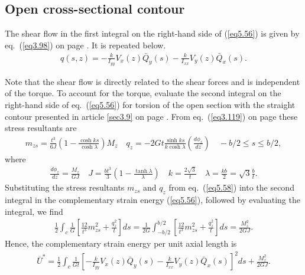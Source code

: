 \documentclass{AeroStructure-ERJohnson}
\begin{document}
\subsection{Open cross-sectional contour}\label{sec5.5.1}

The shear flow in the first integral on the right-hand side of (\ref{eq5.56}) is given by eq.~(\ref{eq3.98}) on page \pageref{eq3.98}. It is repeated below.
\begin{align}\label{eq5.57}
q(s, z)=-\frac{k}{I_{y y}} V_{x}(z) \bar{Q}_{y}(s)-\frac{k}{I_{x x}} V_{y}(z) \bar{Q}_{x}(s).
\end{align}
\vspace*{5pt}
\clearpage

\noindent Note that the shear flow is directly related to the shear forces and is independent of the torque. To account for the torque, evaluate the second integral on the right-hand side of eq.~(\ref{eq5.56}) for torsion of the open section with the straight contour presented in article \ref{sec3.9} on page \pageref{sec3.9}. From eq.~(\ref{eq3.119}) on page \pageref{eq3.119} these stress resultants are
\begin{align}\label{eq5.58}
m_{z s}=\frac{t^{3}}{6 J}\left(1-\frac{\cosh k s}{\cosh \lambda}\right) M_{z} \quad q_{z}=-2 G t \frac{\sinh k s}{k \cosh \lambda}\left(\frac{d \phi_{z}}{d z}\right) \quad-b / 2 \leq s \leq b / 2,
\end{align}
where
\begin{align*}
\frac{d \phi_{z}}{d z}=\frac{M_{z}}{G J} \quad J=\frac{b t^{3}}{3}\left(1-\frac{\tanh \lambda}{\lambda}\right) \quad k=\frac{2 \sqrt{3}}{t} \quad \lambda=\frac{k b}{2}=\sqrt{3} \frac{b}{t}.
\end{align*}
Substituting the stress resultants $m_{z s}$ and $q_z$ from eq.~(\ref{eq5.58}) into the second integral in the complementary strain energy (\ref{eq5.56}), followed by evaluating the integral, we find
\begin{align}\label{eq5.59}
\frac{1}{2} \int_{c} \frac{1}{G}\left[\frac{12}{t^{3}} m_{z s}^{2}+\frac{q_{z}^{2}}{t}\right] d s=\frac{1}{2 G} \int_{-b / 2}^{b / 2}\left[\frac{12}{t^{3}} m_{z s}^{2}+\frac{q_{z}^{2}}{t}\right] d s=\frac{M_{z}^{2}}{2 G J}.
\end{align}
Hence, the complementary strain energy per unit axial length is
\begin{align}\label{eq5.60}
\bar{U}^{*}=\frac{1}{2} \int_{c} \frac{1}{G t}\left[-\frac{k}{I_{y y}} V_{x}(z) \bar{Q}_{y}(s)-\frac{k}{I_{x x}} V_{y}(z) \bar{Q}_{x}(s)\right]^{2} d s+\frac{M_{z}^{2}}{2 G J}.
\end{align}
\end{document}
